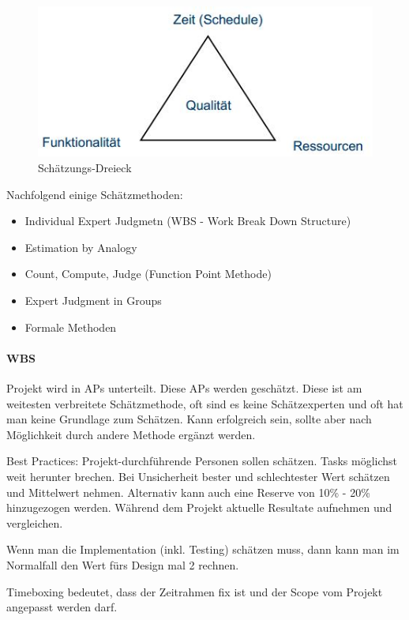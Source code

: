 \begin{figure}[h!]
\centering
\includegraphics[width=0.3\linewidth]{fig/schaetzung-dreieck}
\caption{Schätzungs-Dreieck}
\label{fig:schaetzung-dreieck}
\end{figure}

Nachfolgend einige Schätzmethoden:
\begin{itemize}
	\item Individual Expert Judgmetn (WBS - Work Break Down Structure)
	\item Estimation by Analogy
	\item Count, Compute, Judge (Function Point Methode)
	\item Expert Judgment in Groups
	\item Formale Methoden
\end{itemize}

\paragraph{WBS} Projekt wird in APs unterteilt. Diese APs werden geschätzt. Diese ist am weitesten verbreitete Schätzmethode, oft sind es keine Schätzexperten und oft hat man keine Grundlage zum Schätzen. Kann erfolgreich sein, sollte aber nach Möglichkeit durch andere Methode ergänzt werden.

Best Practices: Projekt-durchführende Personen sollen schätzen. Tasks möglichst weit herunter brechen. Bei Unsicherheit bester und schlechtester Wert schätzen und Mittelwert nehmen. Alternativ kann auch eine Reserve von 10\% - 20\% hinzugezogen werden. Während dem Projekt aktuelle Resultate aufnehmen und vergleichen.

Wenn man die Implementation (inkl. Testing) schätzen muss, dann kann man im Normalfall den Wert fürs Design mal 2 rechnen.

Timeboxing bedeutet, dass der Zeitrahmen fix ist und der Scope vom Projekt angepasst werden darf.


